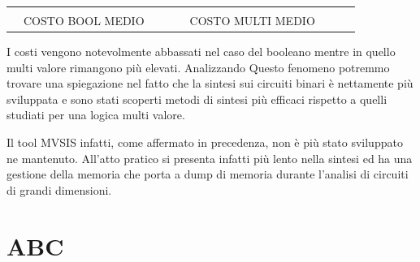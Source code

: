 \documentclass[
]{book}
\begin{document}
\begin{longtable}[]{@{}lllllllll@{}}
\begin{minipage}[t]{0.07\columnwidth}
\strut
\end{minipage}\tabularnewline
\begin{minipage}[t]{0.07\columnwidth}\raggedright
\strut
\end{minipage} & \begin{minipage}[t]{0.11\columnwidth}\raggedright
COSTO BOOL MEDIO\strut
\end{minipage} & \begin{minipage}[t]{0.08\columnwidth}\raggedright
\strut
\end{minipage} & \begin{minipage}[t]{0.07\columnwidth}\raggedright
\strut
\end{minipage} & \begin{minipage}[t]{0.09\columnwidth}\raggedright
\strut
\end{minipage} & \begin{minipage}[t]{0.12\columnwidth}\raggedright
COSTO MULTI MEDIO\strut
\end{minipage} & \begin{minipage}[t]{0.08\columnwidth}\raggedright
\strut
\end{minipage} & \begin{minipage}[t]{0.07\columnwidth}\raggedright
\strut
\end{minipage} & \begin{minipage}[t]{0.07\columnwidth}\raggedright
\strut
\end{minipage}\tabularnewline
\bottomrule
\end{longtable}

I costi vengono notevolmente abbassati nel caso del booleano mentre in quello multi valore rimangono più elevati. Analizzando Questo fenomeno potremmo trovare una spiegazione nel fatto che la sintesi sui circuiti binari è nettamente più sviluppata e sono stati scoperti metodi di sintesi più efficaci rispetto a quelli studiati per una logica multi valore.

Il tool MVSIS infatti, come affermato in precedenza, non è più stato sviluppato ne mantenuto. All'atto pratico si presenta infatti più lento nella sintesi ed ha una gestione della memoria che porta a dump di memoria durante l'analisi di circuiti di grandi dimensioni.

\newpage

\hypertarget{abc-2}{%
\section{ABC}\label{abc-2}}
\end{document}

